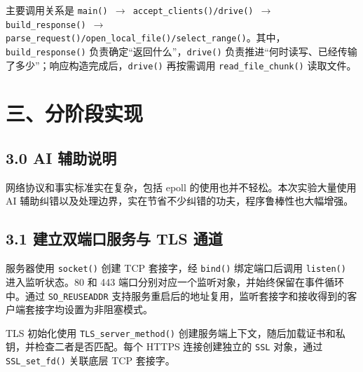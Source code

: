 \documentclass[UTF8,11pt,a4paper,fontset=fandol]{ctexart}
\begin{document}
\begingroup\raggedright
主要调用关系是 \texttt{main(\allowbreak{})\allowbreak{} \ensuremath{\rightarrow} accept\_\allowbreak{}clients(\allowbreak{})\allowbreak{}/\allowbreak{}drive(\allowbreak{})\allowbreak{} \ensuremath{\rightarrow} build\_\allowbreak{}response(\allowbreak{})\allowbreak{} \ensuremath{\rightarrow} parse\_\allowbreak{}request(\allowbreak{})\allowbreak{}/\allowbreak{}open\_\allowbreak{}local\_\allowbreak{}file(\allowbreak{})\allowbreak{}/\allowbreak{}select\_\allowbreak{}range(\allowbreak{})\allowbreak{}}。其中，\texttt{build\_\allowbreak{}response(\allowbreak{})\allowbreak{}} 负责确定“返回什么”，\texttt{drive(\allowbreak{})\allowbreak{}} 负责推进“何时读写、已经传输了多少”；响应构造完成后，\texttt{drive(\allowbreak{})\allowbreak{}} 再按需调用 \texttt{read\_\allowbreak{}file\_\allowbreak{}chunk(\allowbreak{})\allowbreak{}} 读取文件。
\par\endgroup


\section*{三、分阶段实现}

\subsection*{3.0 AI 辅助说明}

网络协议和事实标准实在复杂，包括 epoll 的使用也并不轻松。本次实验大量使用 AI 辅助纠错以及处理边界，实在节省不少纠错的功夫，程序鲁棒性也大幅增强。


\subsection*{3.1 建立双端口服务与 TLS 通道}

服务器使用 \texttt{socket(\allowbreak{})\allowbreak{}} 创建 TCP 套接字，经 \texttt{bind(\allowbreak{})\allowbreak{}} 绑定端口后调用 \texttt{listen(\allowbreak{})\allowbreak{}} 进入监听状态。80 和 443 端口分别对应一个监听对象，并始终保留在事件循环中。通过 \texttt{SO\_\allowbreak{}REUSEADDR} 支持服务重启后的地址复用，监听套接字和接收得到的客户端套接字均设置为非阻塞模式。


TLS 初始化使用 \texttt{TLS\_\allowbreak{}server\_\allowbreak{}method(\allowbreak{})\allowbreak{}} 创建服务端上下文，随后加载证书和私钥，并检查二者是否匹配。每个 HTTPS 连接创建独立的 \texttt{SSL} 对象，通过 \texttt{SSL\_\allowbreak{}set\_\allowbreak{}fd(\allowbreak{})\allowbreak{}} 关联底层 TCP 套接字。
\end{document}
